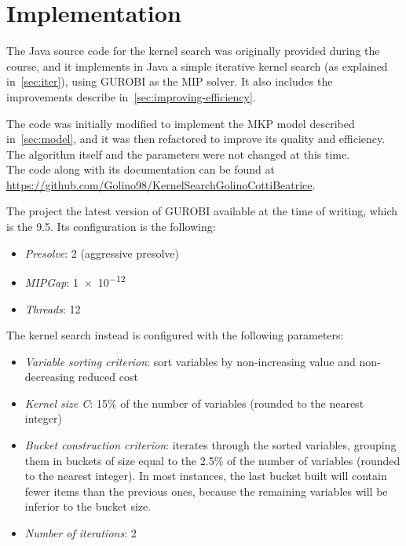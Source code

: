 \chapter{Implementation}

The Java source code for the kernel search was originally provided during the course,
and it implements in Java a simple iterative kernel search (as explained in~\ref{sec:iter}),
using GUROBI as the MIP solver.
It also includes the improvements describe in~\ref{sec:improving-efficiency}.

The code was initially modified to implement the MKP model described in~\ref{sec:model},
and it was then refactored to improve its quality and efficiency.
The algorithm itself and the parameters were not changed at this time.\\

The code along with its documentation can be found at
\url{https://github.com/Golino98/KernelSearchGolinoCottiBeatrice}.

The project the latest version of GUROBI available at the time of writing, which is the 9.5.
Its configuration is the following:
\begin{itemize}
    \item \textit{Presolve}: 2 (aggressive presolve)
    \item \textit{MIPGap}: \num{1e-12}
    \item \textit{Threads}: 12
\end{itemize}

The kernel search instead is configured with the following parameters:
\begin{itemize}
    \item \textit{Variable sorting criterion}: sort variables by non-increasing value and non-decreasing reduced cost
    \item \textit{Kernel size C}: 15\% of the number of variables (rounded to the nearest integer)
    \item \textit{Bucket construction criterion}: iterates through the sorted variables, grouping them in
    buckets of size equal to the 2.5\% of the number of variables (rounded to the nearest integer).
    In most instances, the last bucket built will contain fewer items than the previous ones, because the remaining
    variables will be inferior to the bucket size.
    \item \textit{Number of iterations}: 2
\end{itemize}

